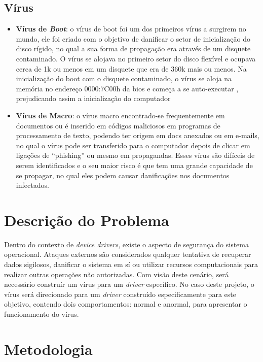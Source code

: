 \subsection{Vírus}

\begin{itemize}
  \item \textbf{Vírus de \textit{Boot}}: o vírus de boot foi um dos primeiros vírus a surgirem no mundo,
    ele foi criado com o objetivo de danificar o setor de inicialização do disco rígido,
    no qual a sua forma de propagação era através de um disquete contaminado. O vírus se
    alojava no primeiro setor do disco flexível e ocupava cerca de 1k ou menos em um
    disquete que era de 360k mais ou menos. Na inicialização do boot com o disquete
    contaminado, o vírus se aloja na memória no endereço 0000:7C00h da bios e começa
    a se auto-executar , prejudicando assim a inicialização do computador

  \item \textbf{Vírus de Macro}: o vírus macro encontrado-se frequentemente em documentos ou é
    inserido em códigos maliciosos em programas de processamento de texto, podendo ter
    origem em docs anexados ou em e-mails, no qual o vírus pode ser transferido para o
    computador depois de clicar em ligações de “phishing” ou mesmo em propagandas. Esses
    vírus são difíceis de serem identificados e o seu maior risco é que tem uma grande
    capacidade de se propagar, no qual eles podem causar danificações nos documentos infectados.
\end{itemize}

\section{Descrição do Problema}

Dentro do contexto de \textit{device drivers}, existe o aspecto de segurança do sistema operacional.
Ataques externos são considerados qualquer tentativa de recuperar dados sigilosos, danificar
o sistema em sí ou utilizar recursos computacionais para realizar outras operações não autorizadas.
Com visão deste cenário, será necessário construír um vírus para um \textit{driver} específico.
No caso deste projeto, o vírus será direcionado para um \textit{driver} construído especificamente para
este objetivo, contendo dois comportamentos: normal e anormal, para apresentar o
funcionamento do vírus.

\section{Metodologia}

